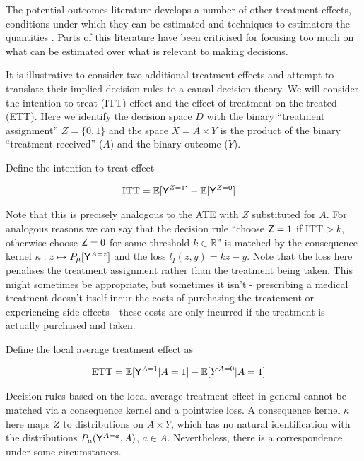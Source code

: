 The potential outcomes literature develops a number of other treatment effects, conditions under which they can be estimated and techniques to estimators the quantities \cite{carneiro_evaluating_2010,imbens_identification_1994,angrist_identification_1996}. Parts of this literature have been criticised for focusing too much on what can be estimated over what is relevant to making decisions\cite{heckman_policy-relevant_2001}. 

It is illustrative to consider two additional treatment effects and attempt to translate their implied decision rules to a causal decision theory. We will consider the intention to treat (ITT) effect and the effect of treatment on the treated (ETT). Here we identify the decision space $D$ with the binary ``treatment assignment'' $Z=\{0,1\}$ and the space $X=A\times Y$ is the product of the binary ``treatment received'' ($A$) and the binary outcome ($Y$). 

Define the intention to treat effect

\begin{align}
    \text{ITT} &= \mathbb{E}[\mathsf{Y}^{Z=1}] - \mathbb{E}[\mathsf{Y}^{Z=0}]
\end{align}

Note that this is precisely analogous to the ATE with $Z$ substituted for $A$. For analogous reasons we can say that the decision rule ``choose $\mathsf{Z}=1$ if $\text{ITT}>k$, otherwise choose $\mathsf{Z}=0$ for some threshold $k\in \mathbb{R}$'' is matched by the consequence kernel $\kappa:z\mapsto P_{\mu}[\mathsf{Y}^{A=z}]$ and the loss $l_{I}(z,y)=kz - y$. Note that the loss here penalises the treatment assignment rather than the treatment being taken. This might sometimes be appropriate, but sometimes it isn't - prescribing a medical treatment doesn't itself incur the costs of purchasing the treatement or experiencing side effects - these costs are only incurred if the treatment is actually purchased and taken.

Define the local average treatment effect as \cite{shpitser_effects_2009}

\begin{align}
    \text{ETT} &= \mathbb{E}[\mathsf{Y}^{A=1}|A=1] - \mathbb{E}[Y^{A=0}|A=1]
\end{align}

Decision rules based on the local average treatment effect in general cannot be matched via a consequence kernel and a pointwise loss. A consequence kernel $\kappa$ here maps $Z$ to distributions on $A\times Y$, which has no natural identification with the distributions $P_\mu(\mathsf{Y}^{A=a},A)$, $a\in A$. Nevertheless, there is a correspondence under some circumstances.


